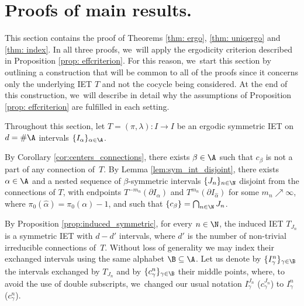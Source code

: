 \section{Proofs of main results.}

This section contains the proof of Theorems \ref{thm: ergo}, \ref{thm: uniqergo} and \ref{thm: index}. In all three proofs, we~will apply the ergodicity criterion described in Proposition \ref{prop: effcriterion}. For this reason, we~start this section by outlining a construction that will be common to all of the proofs since it concerns only the underlying IET $T$ and not the cocycle being considered. At the end of this construction, we~will describe in detail why the assumptions of Proposition \ref{prop: effcriterion} are fulfilled in each setting.

Throughout this section, let $T=(\pi,\lambda): I \to I$ be an ergodic symmetric IET on $d = \#\A$ intervals $\{I_\alpha\}_{\alpha \in \A}$.

By Corollary \ref{cor:centers_connections}, there exists $\beta \in \A$ such that $c_{\beta}$ is not a part of any connection of~$T$. By Lemma \ref{lem:sym_int_disjoint}, there exists $\alpha \in \A$ and a nested sequence of $\beta$-symmetric intervals $\{J_n\}_{n \in \N}$ disjoint from the connections of $T$, with endpoints $T^{-m_n}(\partial I_{\alpha})$ and $T^{m_n}(\partial I_{\hat\alpha})$ for some $m_n \nearrow \infty$, where $\pi_0(\hat\alpha) = \pi_0(\alpha)-1$, and such that $\{c_\beta\} = \bigcap_{n \in \N} J_n$.

By Proposition \ref{prop:induced_symmetric}, for every $n\in\N$, the induced IET $T_{J_n}$ is a symmetric IET with $d - d'$ intervals, where $d'$ is the number of non-trivial irreducible connections of~$T$. Without loss of generality we may index their exchanged intervals using the same alphabet $\B \subseteq \A$. Let us denote by $\{I_\gamma^n\}_{\gamma \in \B}$ the intervals exchanged by $T_{J_n}$ and by $\{c_\gamma^n\}_{\gamma \in \B}$ their middle points, where, to avoid the use of double subscripts, we~changed our usual notation $I_\gamma^{J_n}$ (\resp $c_\gamma^{J_n}$) to $I_\gamma^n$ (\resp $c_\gamma^n$).

